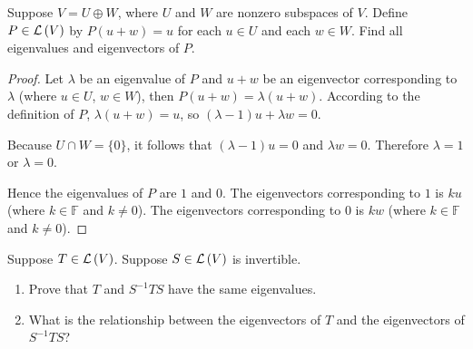 \begin{exercise}
    Suppose $V = U\oplus W$, where $U$ and $W$ are nonzero subspaces of $V$. Define $P\in\mathcal{L}\left({V}\right)$ by $P(u + w) = u$ for each $u\in U$ and each $w\in W$. Find all eigenvalues and eigenvectors of $P$.
\end{exercise}

\begin{proof}
    Let $\lambda$ be an eigenvalue of $P$ and $u + w$ be an eigenvector corresponding to $\lambda$ (where $u\in U$, $w\in W$), then $P(u + w) = \lambda(u + w)$. According to the definition of $P$, $\lambda (u + w) = u$, so $(\lambda - 1)u + \lambda w = 0$.

    Because $U\cap W = \{0\}$, it follows that $(\lambda - 1)u = 0$ and $\lambda w = 0$. Therefore $\lambda = 1$ or $\lambda = 0$.

    Hence the eigenvalues of $P$ are $1$ and $0$. The eigenvectors corresponding to $1$ is $ku$ (where $k\in\mathbb{F}$ and $k\ne 0$). The eigenvectors corresponding to $0$ is $kw$ (where $k\in\mathbb{F}$ and $k\ne 0$).
\end{proof}
\newpage

\begin{exercise}
    Suppose $T\in\mathcal{L}\left({V}\right)$. Suppose $S\in\mathcal{L}\left({V}\right)$ is invertible.
    \begin{enumerate}[label={(\alph*)}]
        \item Prove that $T$ and $S^{-1}TS$ have the same eigenvalues.
        \item What is the relationship between the eigenvectors of $T$ and the eigenvectors of $S^{-1}TS$?
    \end{enumerate}
\end{exercise}

